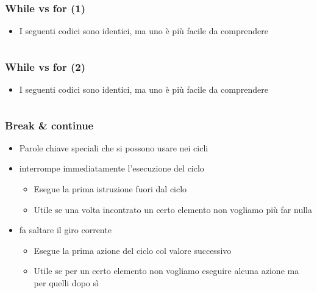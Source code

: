 \begin{contentframe}
    \frametitle{While vs for (1)}

    \begin{itemize}
        \item I seguenti codici sono identici, ma uno è più facile da comprendere
    \end{itemize}

    \begin{columns}
        \centering
        
        \centering
    \end{columns}
\end{contentframe}

\begin{contentframe}
    \frametitle{While vs for (2)}

    \begin{itemize}
        \item I seguenti codici sono identici, ma uno è più facile da comprendere
    \end{itemize}

    \begin{columns}
        \centering
        
        \centering
    \end{columns}
\end{contentframe}

\begin{contentframe}
    \frametitle{Break \& continue}

    \begin{itemize}
        \item Parole chiave speciali che si possono usare nei cicli

        \bigskip
        \item {} interrompe immediatamente l'esecuzione del ciclo
        \begin{itemize}
            \item Esegue la prima istruzione fuori dal ciclo
            \item Utile se una volta incontrato un certo elemento non vogliamo più far nulla
        \end{itemize}

        \bigskip
        \item {} fa saltare il giro corrente
        \begin{itemize}
            \item Esegue la prima azione del ciclo col valore successivo
            \item Utile se per un certo elemento non vogliamo eseguire alcuna azione ma per quelli dopo sì
        \end{itemize}
    \end{itemize}
\end{contentframe}

